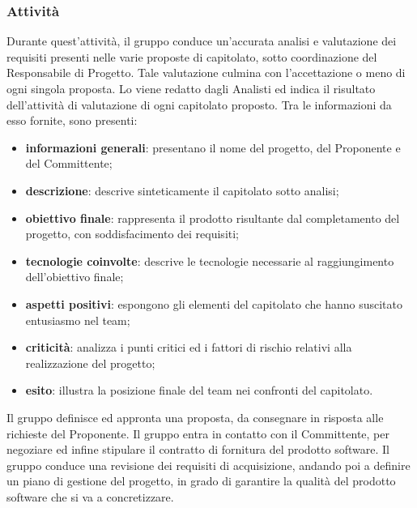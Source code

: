     \subsubsection{Attività}
    Durante quest'attività, il gruppo conduce un'accurata analisi e valutazione dei requisiti presenti nelle varie proposte di capitolato, sotto coordinazione del Responsabile di Progetto. Tale valutazione culmina con l'accettazione o meno di ogni singola proposta.
    Lo \SdF{} viene redatto dagli Analisti ed indica il risultato dell'attività di valutazione di ogni capitolato proposto. Tra le informazioni da esso fornite, sono presenti:
    \begin{itemize}
        \item{\textbf{informazioni generali}: presentano il nome del progetto, del Proponente e del Committente;}
        \item{\textbf{descrizione}: descrive sinteticamente il capitolato sotto analisi;}
        \item{\textbf{obiettivo finale}: rappresenta il prodotto risultante dal completamento del progetto, con soddisfacimento dei requisiti;}
        \item{\textbf{tecnologie coinvolte}: descrive le tecnologie necessarie al raggiungimento dell'obiettivo finale;}
        \item{\textbf{aspetti positivi}: espongono gli elementi del capitolato che hanno suscitato entusiasmo nel team;}
        \item{\textbf{criticità}: analizza i punti critici ed i fattori di rischio relativi alla realizzazione del progetto;}
        \item{\textbf{esito}: illustra la posizione finale del team nei confronti del capitolato.}
    \end{itemize}
    Il gruppo definisce ed appronta una proposta, da consegnare in risposta alle richieste del Proponente.
    Il gruppo entra in contatto con il Committente, per negoziare ed infine stipulare il contratto di fornitura del prodotto software.
    Il gruppo conduce una revisione dei requisiti di acquisizione, andando poi a definire un piano di gestione del progetto, in grado di garantire la qualità del prodotto software che si va a concretizzare.
